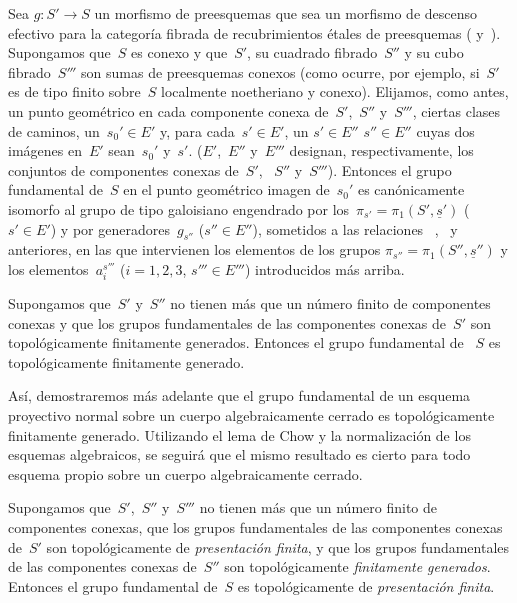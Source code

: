 \begin{theoreme}
\label{IX.5.1}
Sea $g\colon S'\to S$ un morfismo de preesquemas que sea un morfismo de
descenso efectivo para la categoría fibrada de recubrimientos étales de
preesquemas (\cf {} y~). Supongamos que~$S$ es conexo
y que~$S'$, su cuadrado fibrado~$S''$ y su cubo fibrado~$S'''$ son sumas de
preesquemas conexos (como ocurre, por ejemplo, si~$S'$ es de tipo finito
sobre~$S$ localmente noetheriano y conexo). Elijamos, como antes, un punto
geométrico en cada componente conexa de~$S'$,~$S''$ y~$S'''$, ciertas clases
de caminos, un~$s_0'\in E'$ y, para cada~$s'\in E'$, un
{$s'\in E''$}
{$s''\in E''$}
cuyas dos imágenes en~$E'$ sean~$s_0'$ y~$s'$. ($E'$,~$E''$ y~$E'''$
designan, respectivamente, los conjuntos de componentes conexas de~$S'$,
~$S''$ y~$S'''$). Entonces el grupo fundamental de~$S$ en el punto geométrico
imagen de~$s_0'$ es canónicamente isomorfo al grupo de tipo galoisiano
engendrado por los~$\pi_{s'}=\pi_1(S',\underline{s}')$ ($s'\in E'$) y por
generadores~$g_{s''}$ ($s''\in E''$), sometidos a las relaciones
~,~ y~ anteriores, en las que
intervienen los elementos de los grupos
$\pi_{s''}=\pi_1(S'',\underline{s}'')$ y los elementos~$a_i^{s'''}$
($i=1,2,3$, $s'''\in E'''$) introducidos más arriba.
\end{theoreme}

\begin{corollaire}
\label{IX.5.2}
Supongamos que~$S'$ y~$S''$ no tienen más que un número finito de componentes
conexas y que los grupos fundamentales de las componentes conexas de~$S'$
son topológicamente finitamente generados. Entonces el grupo fundamental de
~$S$ es topológicamente finitamente generado.
\end{corollaire}

Así,
demostraremos más adelante que el grupo fundamental de un esquema proyectivo
normal sobre un cuerpo algebraicamente cerrado es topológicamente finitamente
generado. Utilizando el lema de Chow y la normalización de los esquemas
algebraicos, se seguirá que el mismo resultado es cierto para todo esquema
propio sobre un cuerpo algebraicamente cerrado.

\begin{corollaire}
\label{IX.5.3}
Supongamos que~$S'$,~$S''$ y~$S'''$ no tienen más que un número finito de
componentes conexas, que los grupos fundamentales de las componentes conexas
de~$S'$ son topológicamente de \emph{presentación finita}, y que los grupos
fundamentales de las componentes conexas de~$S''$ son topológicamente
\emph{finitamente generados}. Entonces el grupo fundamental de~$S$ es
topológicamente de \emph{presentación finita}.
\end{corollaire}

